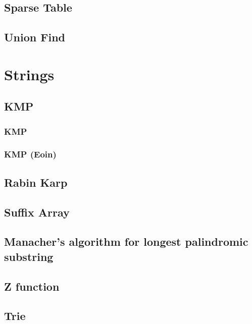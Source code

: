 \documentclass[twocolumn, landscape]{report}
\begin{document}
        \section{Sparse Table}
        
        \section{Union Find}
        

    \chapter*{Strings}
        \section{KMP}
            \subsection{KMP}
            
            \subsection{KMP (Eoin)}
            
        \section{Rabin Karp}
        
        \section{Suffix Array}
        
        \section[Manacher's Algorithm]{Manacher's algorithm for longest palindromic substring}
        
        \section{Z function}
        
        \section{Trie}
        
\end{document}
